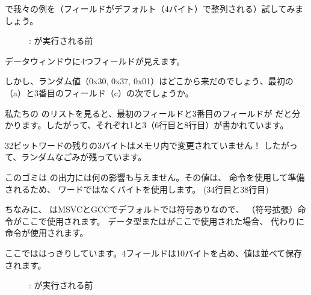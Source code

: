 ﻿\clearpage
{}
\myindex{\olly}

\olly で我々の例を（フィールドがデフォルト（4バイト）で整列される）試してみましょう。

\begin{figure}[H]
\centering
{}
\caption{\olly: \printf が実行される前}
\label{fig:packing_olly_4}
\end{figure}

データウィンドウに4つフィールドが見えます。

しかし、ランダム値（0x30, 0x37, 0x01）はどこから来だのでしょう、最初の（a）と3番目のフィールド（c）の次でしょうか。

私たちの  のリストを見ると、最初のフィールドと3番目のフィールドが
\Tchar だと分かります。したがって、それぞれ1と3（6行目と8行目）が書かれています。

32ビットワードの残りの3バイトはメモリ内で変更されていません！ 
したがって、ランダムなごみが残っています。

このゴミは \printf の出力には何の影響も与えません。その値は、 \MOVSX 命令を使用して準備されるため、
ワードではなくバイトを使用します。
 (34行目と38行目)

ちなみに、 \Tchar はMSVCとGCCでデフォルトでは符号ありなので、
\MOVSX （符号拡張）命令がここで使用されます。 
データ型またはがここで使用された場合、
代わりに \MOVZX 命令が使用されます。

\clearpage
{}
\myindex{\olly}

ここでははっきりしています。4フィールドは10バイトを占め、値は並べて保存されます。

\begin{figure}[H]
\centering
{}
\caption{\olly: \printf が実行される前}
\label{fig:packing_olly_1}
\end{figure}
